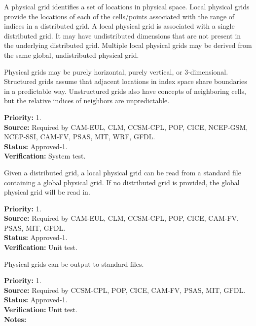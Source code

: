 
A physical grid identifies a set of locations in physical space.  
Local physical grids provide the locations of each of the cells/points
associated with the range of indices in a distributed grid.  A local physical grid is
associated with a single distributed grid.  It may have undistributed dimensions that 
are not present in the underlying distributed grid. Multiple local 
physical grids may be derived from the same global, undistributed physical grid. 

Physical grids may be purely horizontal, purely vertical, or 3-dimensional. 
Structured grids assume that adjacent locations in index space share boundaries
in a predictable way.  Unstructured grids also have concepts of neighboring
cells, but the relative indices of neighbors are unpredictable.

\begin{reqlist}
{\bf Priority:} 1. \\
{\bf Source:} Required by CAM-EUL, CLM, CCSM-CPL, POP, CICE, NCEP-GSM, NCEP-SSI,
     CAM-FV, PSAS, MIT, WRF, GFDL. \\
{\bf Status:} Approved-1. \\
{\bf Verification:} System test.
\end{reqlist}

Given a distributed grid, a local physical grid can be read from a standard file containing a
global physical grid. If no distributed grid is provided, the global physical grid will
be read in.
\begin{reqlist}
{\bf Priority:} 1. \\
{\bf Source:} Required by CAM-EUL, CLM, CCSM-CPL, POP, CICE, 
              CAM-FV, PSAS, MIT, GFDL. \\
{\bf Status:} Approved-1. \\
{\bf Verification:} Unit test.
\end{reqlist}

Physical grids can be output to standard files.
\begin{reqlist}
{\bf Priority:} 1. \\
{\bf Source:} Required by CCSM-CPL, POP, CICE, 
              CAM-FV, PSAS, MIT, GFDL. \\
{\bf Status:} Approved-1. \\
{\bf Verification:} Unit test.\\
{\bf Notes:} 
\end{reqlist}


